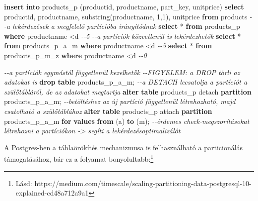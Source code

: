 \documentclass[
  magyar,
]{article}
\newenvironment{Shaded}{}{}
\newcommand{\CommentTok}[1]{\textcolor[rgb]{0.38,0.63,0.69}{\textit{#1}}}
\newcommand{\ControlFlowTok}[1]{\textcolor[rgb]{0.00,0.44,0.13}{\textbf{#1}}}
\newcommand{\DecValTok}[1]{\textcolor[rgb]{0.25,0.63,0.44}{#1}}
\newcommand{\KeywordTok}[1]{\textcolor[rgb]{0.00,0.44,0.13}{\textbf{#1}}}
\newcommand{\NormalTok}[1]{#1}
\newcommand{\OperatorTok}[1]{\textcolor[rgb]{0.40,0.40,0.40}{#1}}
\newcommand{\StringTok}[1]{\textcolor[rgb]{0.25,0.44,0.63}{#1}}
\begin{document}
\begin{Shaded}
\begin{Highlighting}[]
\KeywordTok{insert} \KeywordTok{into}\NormalTok{ products\_p (productid, productname, part\_key, unitprice)}
   \KeywordTok{select}\NormalTok{ productid, productname, substring(productname, }\DecValTok{1}\NormalTok{,}\DecValTok{1}\NormalTok{), unitprice }\KeywordTok{from}
\NormalTok{products}
\CommentTok{{-}{-}a lekérdezések a megfelelő partícióba irányítódnak}
\KeywordTok{select} \OperatorTok{*} \KeywordTok{from}\NormalTok{ products\_p }\KeywordTok{where}\NormalTok{ productname }\OperatorTok{\textless{}}\StringTok{\textquotesingle{}d\textquotesingle{}} \CommentTok{{-}{-}5}
\CommentTok{{-}{-}a partíciók közvetlenül is lekérdezhetők}
\KeywordTok{select} \OperatorTok{*} \KeywordTok{from}\NormalTok{ products\_p\_a\_m }\KeywordTok{where}\NormalTok{ productname }\OperatorTok{\textless{}}\StringTok{\textquotesingle{}d\textquotesingle{}} \CommentTok{{-}{-}5}
\KeywordTok{select} \OperatorTok{*} \KeywordTok{from}\NormalTok{ products\_p\_m\_z }\KeywordTok{where}\NormalTok{ productname }\OperatorTok{\textless{}}\StringTok{\textquotesingle{}d\textquotesingle{}} \CommentTok{{-}{-}0}

\CommentTok{{-}{-}a partíciók egymástól függetlenül kezelhetők}
\CommentTok{{-}{-}FIGYELEM: a DROP törli az adatokat is}
\KeywordTok{drop} \KeywordTok{table}\NormalTok{ products\_p\_a\_m;}
\CommentTok{{-}{-}a DETACH lecsatolja a partíciót a szülőtábláról, de az adatokat megtartja}
\KeywordTok{alter} \KeywordTok{table}\NormalTok{ products\_p detach }\KeywordTok{partition}\NormalTok{ products\_p\_a\_m;}
\CommentTok{{-}{-}betöltéshez az új partíció függetlenül létrehozható, majd csatolható a szülőtáblához}
\KeywordTok{alter} \KeywordTok{table}\NormalTok{ products\_p attach }\KeywordTok{partition}\NormalTok{ products\_p\_a\_m }\ControlFlowTok{for} \KeywordTok{values} \KeywordTok{from}\NormalTok{ (}\StringTok{\textquotesingle{}a\textquotesingle{}}\NormalTok{) }\KeywordTok{to}\NormalTok{ (}\StringTok{\textquotesingle{}m\textquotesingle{}}\NormalTok{);}
\CommentTok{{-}{-}érdemes check{-}megszorításokat létrehozni a partíciókon {-}\textgreater{} segíti a lekérdezésoptimalizálót}
\end{Highlighting}
\end{Shaded}

A Postgres-ben a táblaörökítés mechanizmusa is felhasználható a
particionálás támogatásához, bár ez a folyamat bonyolultabb:\footnote{Lásd:
  https://medium.com/timescale/scaling-partitioning-data-postgresql-10-explained-cd48a712a9a1}
\end{document}
